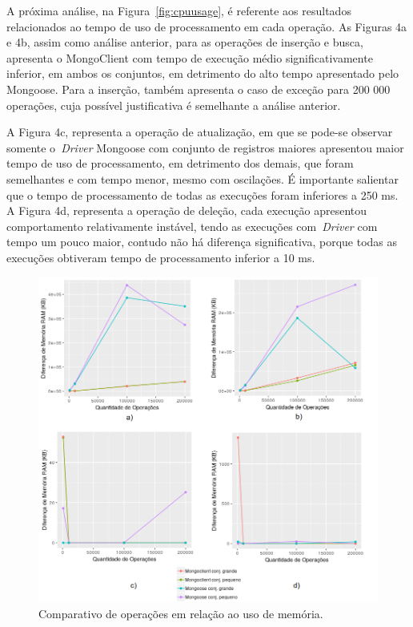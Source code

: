 \documentclass[12pt]{article}
\begin{document}
A próxima análise, na Figura~\ref{fig:cpuusage}, é referente aos resultados relacionados ao tempo de uso de processamento em cada operação.
As Figuras 4a e 4b, assim como análise anterior, para as operações de inserção e busca, apresenta o MongoClient com tempo de execução médio significativamente inferior, em ambos os conjuntos, em detrimento do alto tempo apresentado pelo Mongoose.
Para a inserção, também apresenta o caso de exceção para 200 000 operações, cuja possível justificativa é semelhante a análise anterior.

A Figura 4c, representa a operação de atualização, em que se pode-se observar somente o~\emph{Driver} Mongoose com conjunto de registros maiores apresentou maior tempo de uso de processamento, em detrimento dos demais, que foram semelhantes e com tempo menor, mesmo com oscilações. 
É importante salientar que o tempo de processamento de todas as execuções foram inferiores a 250 ms.
A Figura 4d, representa a operação de deleção, cada execução apresentou comportamento relativamente instável, tendo as execuções com~\emph{Driver} com tempo um pouco maior, contudo não há diferença significativa, porque todas as execuções obtiveram tempo de processamento inferior a 10 ms.

\begin{figure}[!ht]
    \centering
    \includegraphics[width=\textwidth]{images/memory}
    \caption{Comparativo de operações em relação ao uso de memória.}
    \label{fig:memory}
\end{figure}
\end{document}
